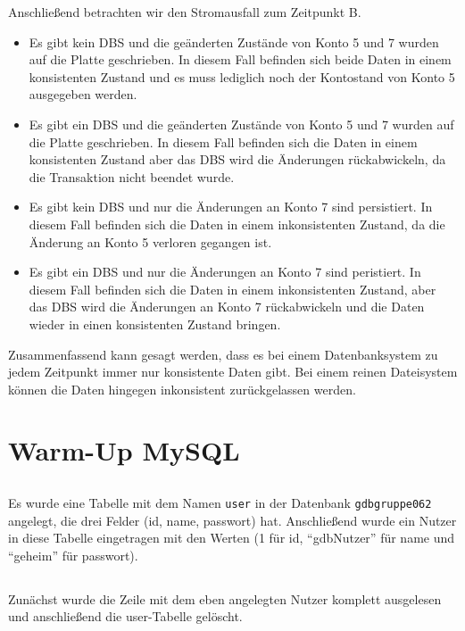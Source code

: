 \documentclass[ngerman]{gdb-aufgabenblatt}
\begin{document}
	Anschließend betrachten wir den Stromausfall zum Zeitpunkt B.
	
	\begin{itemize}
		 \item	Es gibt kein DBS und die geänderten Zustände von Konto 5 und 7 wurden auf die Platte geschrieben. In diesem Fall befinden sich beide Daten in einem konsistenten Zustand und es muss lediglich noch der Kontostand von Konto 5 ausgegeben werden.
		 \item	Es gibt ein DBS und die geänderten Zustände von Konto 5 und 7 wurden auf die Platte geschrieben. In diesem Fall befinden sich die Daten in einem konsistenten Zustand aber das DBS wird die Änderungen rückabwickeln, da die Transaktion nicht beendet wurde.
		 \item	Es gibt kein DBS und nur die Änderungen an Konto 7 sind persistiert. In diesem Fall befinden sich die Daten in einem inkonsistenten Zustand, da die Änderung an Konto 5 verloren gegangen ist.
		 \item	Es gibt ein DBS und nur die Änderungen an Konto 7 sind peristiert. In diesem Fall befinden sich die Daten in einem inkonsistenten Zustand, aber das DBS wird die Änderungen an Konto 7 rückabwickeln und die Daten wieder in einen konsistenten Zustand bringen.
	\end{itemize}
	
	Zusammenfassend kann gesagt werden, dass es bei einem Datenbanksystem zu jedem Zeitpunkt immer nur konsistente Daten gibt.  Bei einem reinen Dateisystem können die Daten hingegen inkonsistent zurückgelassen werden.

\section{Warm-Up MySQL}
	\subsection{} %
		Es wurde eine Tabelle mit dem Namen \texttt{user} in der Datenbank \texttt{gdb\textunderscore gruppe062} angelegt, die drei Felder (id, name, passwort) hat. Anschließend wurde ein Nutzer in diese Tabelle eingetragen mit den Werten (1 für id, "`gdbNutzer"' für name und "`geheim"' für passwort).
	\subsection{} %
		Zunächst wurde die Zeile mit dem eben angelegten Nutzer komplett ausgelesen und anschließend die user-Tabelle gelöscht.
\end{document}
